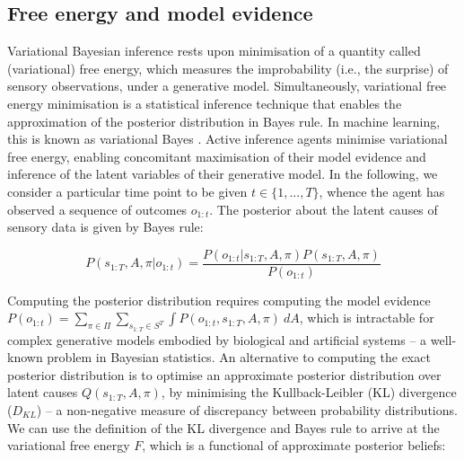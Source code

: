 \documentclass{article}
\begin{document}
\subsection{Free energy and model evidence}

Variational Bayesian inference rests upon minimisation of a quantity called (variational) free energy, which measures the improbability (i.e., the surprise) of sensory observations, under a generative model. Simultaneously, variational free energy minimisation is a statistical inference technique that enables the approximation of the posterior distribution in Bayes rule. In machine learning, this is known as variational Bayes \cite{bishopPatternRecognitionMachine2006,jordanIntroductionVariationalMethods1998,bealVariationalAlgorithmsApproximate2003,bleiVariationalInferenceReview2017}.
Active inference agents minimise variational free energy, enabling concomitant maximisation of their model evidence and inference of the latent variables of their generative model. In the following, we consider a particular time point to be given $t\in\{1,...,T\}$, whence the agent has observed a sequence of outcomes $o_{1:t}$. The posterior about the latent causes of sensory data is given by Bayes rule:
  	
  	\begin{equation}
  	\label{eq:bayes rule}
  	    P(s_{1:T}, A, \pi |o_{1:t})= \frac{P(o_{1:t} |s_{1:T}, A, \pi )P(s_{1:T}, A, \pi )}{P(o_{1:t})}
  	\end{equation}
  		
  		
Computing the posterior distribution requires computing the model evidence $P(o_{1:t})=\sum_{\pi \in \Pi }\sum_{s_{1:T}\in S^T}\int P(o_{1:t} ,s_{1:T}, A, \pi ) \: dA$, which is intractable for complex generative models embodied by biological and artificial systems \cite{fristonHierarchicalModelsBrain2008} -- a well-known problem in Bayesian statistics.
An alternative to computing the exact posterior distribution is to optimise an approximate posterior distribution over latent causes $Q(s_{1:T}, A, \pi)$, by minimising the Kullback-Leibler (KL) divergence \cite{kullbackInformationSufficiency1951} ($D_{KL}$) -- a non-negative measure of discrepancy between probability distributions. We can use the definition of the KL divergence and Bayes rule to arrive at the variational free energy $F$, which is a functional of approximate posterior beliefs:
\end{document}
